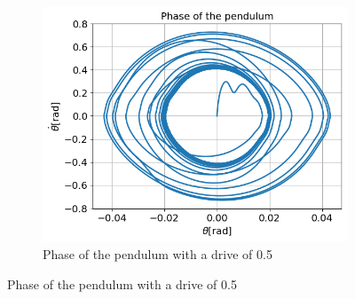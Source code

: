 \documentclass{cmc}
\begin{document}
\begin{figure}[H]
  \begin{subfigure}[b]{0.3\textwidth}
     \centering
      \includegraphics[width=\textwidth]{figures/3_b_0dot5_phase.png}
    \caption{Phase of the pendulum with a drive of 0.5}
    \label{fig:3b_phase}
  \end{subfigure}
  \hfill
  

\end{figure}
\end{document}
